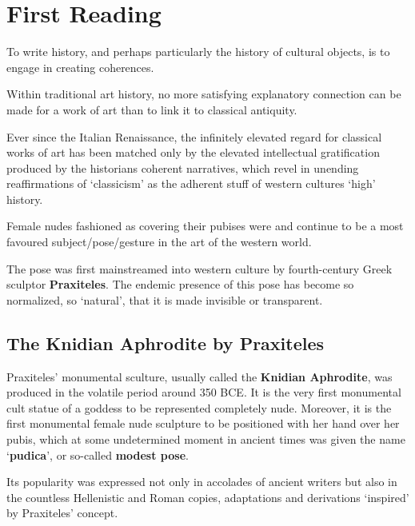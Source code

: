 \section{First Reading}
\label{sec:FirRead8}



To write history, and perhaps particularly the history of cultural objects, is to engage in creating coherences. 

\begin{rmk}
    Within traditional art history, no more satisfying explanatory connection can be made for a work of art than to link it to classical antiquity.
\end{rmk}

Ever since the Italian Renaissance, the infinitely elevated regard for classical works of art has been matched only by the elevated intellectual gratification produced by the historians coherent narratives, which revel in unending reaffirmations of `classicism' as the adherent stuff of western cultures `high' history.


\begin{rmk}
    Female nudes fashioned as covering their pubises were and continue to be a most favoured subject/pose/gesture in the art of the western world.
\end{rmk}

The pose was first mainstreamed into western culture by fourth-century Greek sculptor \textbf{Praxiteles}. The endemic presence of this pose has become so normalized, so `natural', that it is made invisible or transparent.


\subsection{The Knidian Aphrodite by Praxiteles}

Praxiteles' monumental sculture, usually called the \textbf{Knidian Aphrodite}, was produced in the volatile period around 350 BCE. It is the very first monumental cult statue of a goddess to be represented completely nude. Moreover, it is the first monumental female nude sculpture to be positioned with her hand over her pubis, which at some undetermined moment in ancient times was given the name `\textbf{pudica}', or so-called \textbf{modest pose}.

\begin{nte}
    Its popularity was expressed not only in accolades of ancient writers but also in the countless Hellenistic and Roman copies, adaptations and derivations `inspired' by Praxiteles' concept.
\end{nte}

